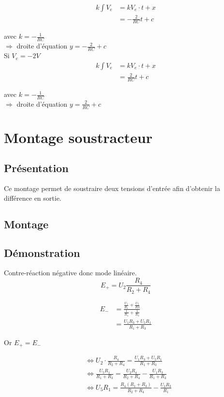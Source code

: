 \begin{align}
k \int V_e &= k V_e\cdot t + x\\
&= - \frac{2}{RC}t+c 
\end{align}

avec $k=-\frac{1}{RC} $ \\

$\Rightarrow$ droite d'équation $y=-\frac{2}{RC}+c$ \\


Si $V_e=-2V$ \\

\begin{align}
k \int V_e &= k V_e\cdot t + x \\
&= \frac{2}{RC}t+c 
\end{align}

avec $k=-\frac{1}{RC} $ \\

$\Rightarrow$ droite d'équation $y=\frac{2}{RC}+c$ \chapter{Montage soustracteur}
\section{Présentation}
Ce montage permet de soustraire deux tensions d’entrée afin d’obtenir la différence en sortie.

\section{Montage}


\section{Démonstration}


Contre-réaction négative donc mode linéaire.\\


$$E_+=U_2\frac{R_4}{R_2+R_4}$$

\begin{align}
E_-&=\frac{\frac{U_1}{R_1}+\frac{U_5}{R3}}{\frac{1}{R_1}+\frac{1}{R_3}}\\
&=\frac{U_1R_3+U_5R_1}{R_1+R_3}
\end{align}

Or $E_+=E_-$

\begin{align}
&\Leftrightarrow U_2 \cdot \frac{R_4}{R_2+R_4} = \frac{U_1R_3+U_5R_1}{R_1+R_3} \\
&\Leftrightarrow  \frac{U_5R_1}{R_1+R_3} = \frac{U_2R_4}{R_2+R_4} -\frac{U_1R_3}{R_1+R_3} \\
&\Leftrightarrow  U_5R_1 = \frac{R_4(R_1+R_3)}{R_2+R_4} - \frac{U_1R_3}{R_1} 
\end{align}


